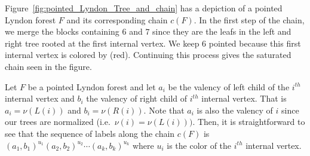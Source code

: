 \documentclass[11pt]{article}
\theoremstyle{definition}
\numberwithin{equation}{section}
\newcommand{\tre}[1]{{\color{red}{#1}}}
\begin{document}
 Figure~\ref{fig:pointed_Lyndon_Tree_and_chain} has  a depiction of a pointed Lyndon forest $F$ and its corresponding chain $c(F)$.  In the first step of the chain, we merge the blocks containing $6$ and $7$ since they are the leafs in the left and right tree rooted at the first internal vertex. We keep $6$ pointed because this first internal vertex is colored by \tre{1} (red). Continuing this process gives the saturated chain seen in the figure.

Let $F$ be a pointed Lyndon forest and let $a_i$ be the valency of left child of the $i^{th}$ internal vertex  and $b_i$ the valency of right child of $i^{th}$  internal vertex.  That is $a_i = \nu(L(i))$ and $b_i =\nu(R(i))$. Note that $a_i$ is also the valency of $i$ since our trees are normalized (i.e.~$\nu(i) =\nu(L(i)))$.  Then, it is straightforward to see that the sequence of labels along the chain $c(F)$ is $(a_1,b_1)^{u_1}(a_2,b_2)^{u_2}\cdots (a_{k},b_{k})^{u_{k}}$ where $u_i$ is the color of the $i^{th}$ internal vertex.
\end{document}
